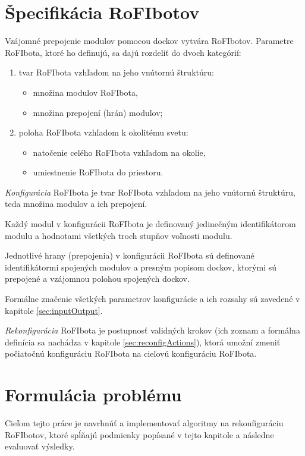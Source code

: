 \documentclass[
  digital, %
  twoside, %
  table,   %
  nolof,     %
  nolot,     %
]{fithesis3}
\begin{document}
\section{Špecifikácia RoFIbotov}
\label{sec:rofibotSec}
Vzájomné prepojenie modulov pomocou dockov vytvára RoFIbotov. Parametre RoFIbota, ktoré ho definujú, sa dajú rozdeliť do dvoch kategórií:   
\begin{enumerate}
    \item tvar RoFIbota vzhľadom na jeho vnútornú štruktúru: 
    \begin{itemize}
        \item množina modulov RoFIbota, 
        \item množina prepojení (hrán) modulov; 
    \end{itemize}
    \item poloha RoFIbota vzhľadom k okolitému svetu: 
    \begin{itemize}
        \item natočenie celého RoFIbota vzhľadom na okolie, 
        \item umiestnenie RoFIbota do priestoru.  
    \end{itemize}
\end{enumerate}

\textit{Konfigurácia} RoFIbota je tvar RoFIbota vzhľadom na jeho vnútornú štruktúru, teda množina modulov a ich prepojení. 

Každý modul v konfigurácii RoFIbota je definovaný jedinečným identifikátorom modulu a hodnotami všetkých troch stupňov voľnosti modulu. 

Jednotlivé hrany (prepojenia) v konfigurácii RoFIbota sú definované identifikátormi spojených modulov a presným popisom dockov, ktorými sú prepojené a vzájomnou polohou spojených dockov. 

Formálne značenie všetkých parametrov konfigurácie a ich rozsahy sú zavedené v kapitole \ref{sec:inputOutput}. 

\textit{Rekonfigurácia} RoFIbota je postupnosť validných krokov (ich zoz\-nam a formálna definícia sa nachádza v kapitole \ref{sec:reconfigActions}), ktorá umožní zmeniť počiatočnú konfiguráciu RoFIbota na cieľovú konfiguráciu RoFIbota. 

\section{Formulácia problému}
\label{sec:restrictions}
Cieľom tejto práce je navrhnúť a implementovať algoritmy na rekonfiguráciu RoFIbotov, ktoré spĺňajú podmienky popísané v tejto kapitole a následne evaluovať výsledky. 
\end{document}
